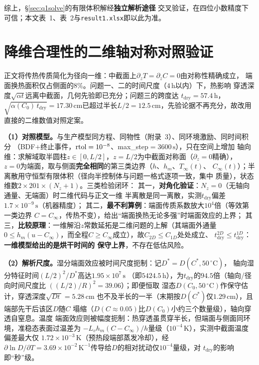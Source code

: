 \documentclass[withoutpreface,bwprint]{cumcmthesis} %
\begin{document}
\begin{appendices}
综上，\S\ref{sec:q1solve}的有限体积解经\textbf{独立解析途径}
交叉验证，在四位小数精度下可信；本文表~1、表~2与\texttt{result1.xlsx}即以此为准。


\section{降维合理性的二维轴对称对照验证}
\label{app:2d}

正文将传热传质简化为径向一维：中截面上$\partial_zT=\partial_zC=0$由对称性精确成立，
端面换热面积仅占侧面的$8\%$。问题一、二的时间尺度（$4\,\mathrm{h}$以内）下，热影响
穿透深度$\sqrt{\alpha t}$远离中截面，几何先验即已充分；问题三的跨度达
$t_{\mathrm{dry}}=57.4\,\mathrm{h}$，$\sqrt{\alpha(C_0)\,t_{\mathrm{dry}}}
=17.30\,\mathrm{cm}$已超过半长$L/2=12.5\,\mathrm{cm}$，先验论据不再充分，故改用
直接的二维数值对照定案。

\textbf{（1）对照模型。}与生产模型同方程、同物性（附录~3）、同环境激励、同时间积分
（BDF$+$终止事件，${\rm rtol}=10^{-8}$、max\_step$=3600\,\mathrm{s}$），只在空间上增加
轴向维：求解域取半圆柱$z\in[0,L/2]$，$z=L/2$为中截面对称面（$\partial_z=0$精确），
$z=0$为端面，取与侧面\textbf{完全相同}的第三类边界（$h$、$h_m$、$T_\infty(t)$、
$C_\infty(t)$）；半离散用守恒型有限体积（径向半控制体与问题一格式逐项一致，集中
质量），状态维数$2\times201\times(N_z+1)$。三类检验闭环：
其一，\textbf{对角化验证}：$N_z=0$（无轴向通量、无端面）时二维代码与正文一维
半离散是同一离散，实测$t_{\mathrm{dry}}$偏差$1.7\times10^{-9}\,\mathrm{s}$（机器精度）；
其二，\textbf{最不利算例}：端面传质系数放大$10^{4}$倍（等效第一类边界
$C=C_\infty$，传热不变），给出``端面换热无论多强''时端面效应的上界；
其三，\textbf{比较原理}：一维解沿$z$常数延拓是二维问题的上解（其端面外通量
$0\le h_m(u-C_\infty)$，而全程$C\ge C_\infty$成立），故$C_{2D}\le C_{1D}$处处成立、
$t_{\mathrm{dry}}^{2D}\le t_{\mathrm{dry}}^{1D}$：\textbf{一维模型给出的是烘干时间的
保守上界}，不存在低估风险。

\textbf{（2）解析尺度。}湿分端面效应被时间尺度扼制：记$D^\ast=D(C^*,50\,^\circ\mathrm{C})$，
轴向湿分特征时间$(L/2)^2/D^\ast$高达$1.95\times10^{7}\,\mathrm{s}$
（即$5424.5\,\mathrm{h}$），为$t_{\mathrm{dry}}$的$94.5$倍（轴向/径向时间尺度比
$((L/2)/R)^2=39.06$）；即便恒取
湿态$D(C_0,50\,^\circ\mathrm{C})$作保守估计，穿透深度$\sqrt{Dt\,}=5.28\,\mathrm{cm}$
也不及半长的一半（末期按$D(C^*)$仅$1.29\,\mathrm{cm}$），且端部先干后该区$D$随$C$
塌缩（$D(C\approx0.05)$比$D(C_0)$小约三个数量级），轴向穿透自窒息。温度
端面效应则被幅度扼制：热穿透虽贯穿半长，但端面与侧面同环境，准稳态表面过温差为
$-L_vh_m(C-C_\infty)/h$量级（$10^{-4}\,\mathrm{K}$），实测中截面温度偏差最大仅
$1.72\times10^{-3}\,\mathrm{K}$（预热段端部蒸发冷却），经$\partial\ln D/\partial T
=3.69\times10^{-2}\,\mathrm{K^{-1}}$传导给$D$的相对扰动仅$10^{-4}$量级，对
$t_{\mathrm{dry}}$的影响即``秒''级。


\end{appendices}
\end{document}
